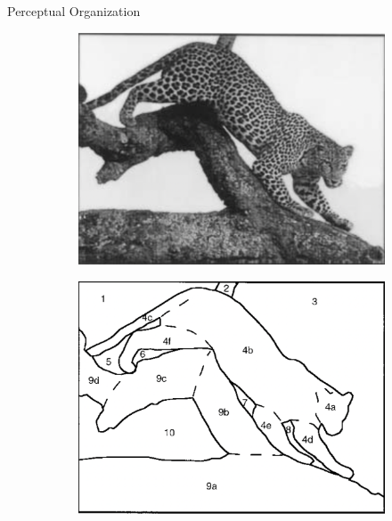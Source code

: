 \documentclass[10pt,xcolor=svgnames]{beamer} %
\begin{document}
\begin{frame}{Perceptual Organization}
    \begin{figure}
        \centering
        \begin{subfigure}{0.3\textwidth}
            \centering
            \includegraphics[width=\textwidth]{pictures/perceptualOrganization_1.png}
            \label{fig:perceptualOrg_a}
            \caption{}
        \end{subfigure}
        \hfill
        \begin{subfigure}{0.3\textwidth}
            \centering
            \includegraphics[width=\textwidth]{pictures/perceptualOrganization_2.png}
            \caption{}
            \label{figure:perceptualOrg_b}

\end{subfigure}
\end{figure}
\end{frame}
\end{document}
